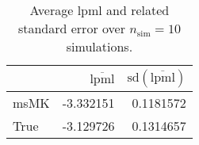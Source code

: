 \begin{table}[H]

\caption{Average lpml and related standard error over $n_{\text{sim}} = 10$ simulations.}
\centering
\begin{tabular}[t]{lrr}
\toprule
  & $\overbar{\text{lpml}}$ & $\text{sd}(\overbar{\text{lpml}})$\\
\midrule
msMK & -3.332151 & 0.1181572\\
True & -3.129726 & 0.1314657\\
\bottomrule
\end{tabular}
\end{table}